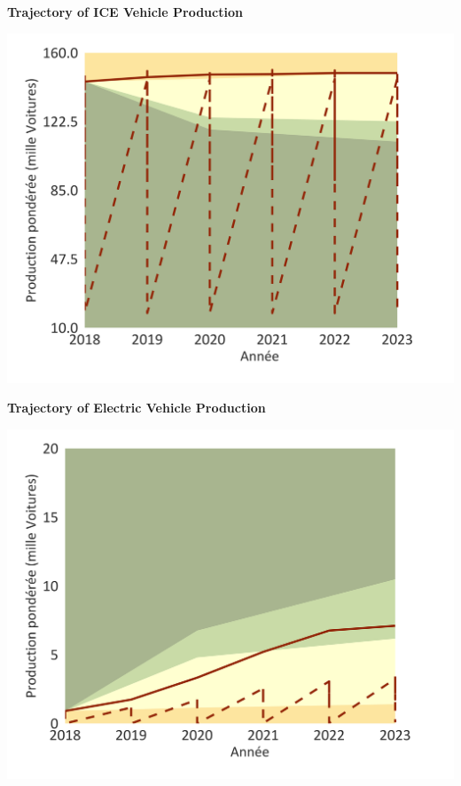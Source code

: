 \documentclass[10pt,table,a4]{article}\usepackage[]{graphicx}\usepackage[]{color}
\begin{document}
	
	\begin{minipage}[t]{.49\linewidth}
		\textbf{Trajectory of ICE Vehicle Production}
		
		\includegraphics[trim = {0 0cm 0 0},width=1\linewidth]{ReportOutputs/Fig24}
		
	\end{minipage}	
	\hspace{.02\linewidth}
	\begin{minipage}[t]{.49\textwidth}
		\textbf{Trajectory of Electric Vehicle Production}
		
		\includegraphics[trim = {0 0cm 0 0},width=1\linewidth]{ReportOutputs/Fig25}
		
	\end{minipage}	
	
\end{document}
